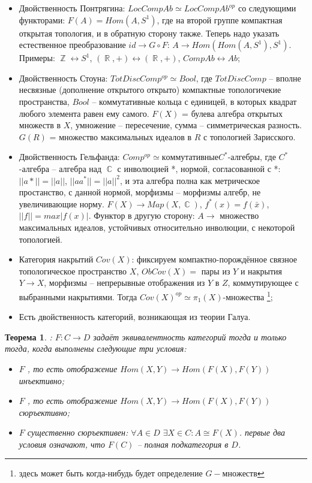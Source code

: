 \documentclass[a4paper]{article}
\theoremstyle{indented}
\newtheorem{theorem}{Теорема}
\theoremstyle{definition}
\theoremstyle{remark}
\DeclareMathOperator{\CC}{\mathbb{C}}
\DeclareMathOperator{\ZZ}{\mathbb{Z}}
\DeclareMathOperator{\RR}{\mathbb{R}}
\begin{document}
\begin{itemize}
\item Двойственность Понтрягина: $LocCompAb\simeq LocCompAb^{op}$ со следующими функторами: $F(A) = Hom(A, S^1)$, где на второй группе компактная открытая топология, и в обратную сторону также. Теперь надо указать естественное преобразование $id \rightarrow G\circ F$: $A \rightarrow Hom(Hom(A, S^1), S^1)$. Примеры: $\ZZ \longleftrightarrow S^1$, $(\RR, +) \longleftrightarrow (\RR, +)$, $CompAb \longleftrightarrow Ab$;
\item Двойственность Стоуна: $TotDiscComp^{op} \simeq  Bool$, где $TotDiscComp$ -- вполне несвязные (дополнение открытого открыто) компактные топологичекие пространства, $Bool$ -- коммутативные кольца с единицей, в которых квадрат любого элемента равен ему самого. $F(X)$ = булева алгебра открытых множеств в $X$, умножение -- пересечение, сумма -- симметрическая разность. $G(R)$ = множество максимальных идеалов в $R$ с топологией Зарисского.
\item Двойственность Гельфанда: $Comp^{op} \simeq коммутативные C^*$-алгебры, где $C^*$-алгебра -- алгебра над $\CC$ с инволюцией *, нормой, согласованной с *: $||a*|| = ||a||$, $||aa^*|| = ||a||^2$, и эта алгебра полна как метрическое простанство, с данной нормой, морфизмы -- морфизмы алгебр, не увеличивающие норму. $F(X) \rightarrow Map(X, \CC)$, $f^*(x) = f(\bar{x})$, $||f|| = max|f(x)|$. Функтор в другую сторону: $A \rightarrow$ множество максимальных идеалов, устойчивых относительно инволюции, с некоторой топологией.
\item Категория накрытий $Cov(X)$: фиксируем компактно-порождённое связное топологическое пространство $X$, $ObCov(X) =$ пары из $Y$ и накрытия $Y \rightarrow X$, морфизмы -- непрерывные отображения из $Y$ в $Z$, коммутирующее с выбранными накрытиями. Тогда $Cov(X)^{op} \simeq \pi_{1}(X)$-множества \footnote{здесь может быть когда-нибудь будет определение $G-множеств$};
\item Есть двойственность категорий, возникающая из теории Галуа.
\end{itemize}
\begin{theorem} : 
$F: C\rightarrow D$ задаёт эквивалентность категорий тогда и только тогда, когда выполнены следующие три условия:\begin{itemize}
\item $F$ , то есть отображение $Hom(X, Y) \rightarrow Hom(F(X), F(Y))$ инъективно;
\item $F$ , то есть отображение $Hom(X, Y) \rightarrow Hom(F(X), F(Y))$ сюръективно;
\item $F$ существенно сюръективен: $\forall A \in D$ $\exists X \in C: A \cong F(X)$.
\remark первые два условия означают, что $F(C)$ -- полная подкатегория в $D$.
\end{itemize}
\end{theorem}
\end{document}
